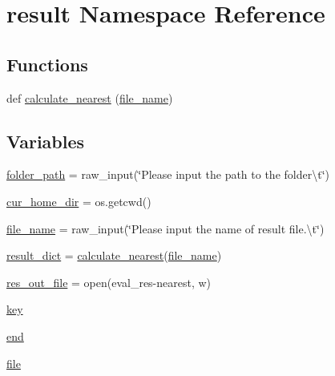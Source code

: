\hypertarget{namespaceresult}{}\section{result Namespace Reference}
\label{namespaceresult}
\subsection*{Functions}
\begin{DoxyCompactItemize}
\item 
def \hyperlink{namespaceresult_a701c28db119049562d7d29ca31055c29}{calculate\+\_\+nearest} (\hyperlink{namespaceresult_acf51e2242cbe71fdb781f378dd1b08f8}{file\+\_\+name})
\end{DoxyCompactItemize}
\subsection*{Variables}
\begin{DoxyCompactItemize}
\item 
\hyperlink{namespaceresult_a28b7e2030adf7744b4ff42da31c0a58a}{folder\+\_\+path} = raw\+\_\+input(\char`\"{}Please input the path to the folder\textbackslash{}t\char`\"{})
\item 
\hyperlink{namespaceresult_ad84b525edcc6cfe3f42a724ad9631920}{cur\+\_\+home\+\_\+dir} = os.\+getcwd()
\item 
\hyperlink{namespaceresult_acf51e2242cbe71fdb781f378dd1b08f8}{file\+\_\+name} = raw\+\_\+input(\char`\"{}Please input the name of result file.\textbackslash{}t\char`\"{})
\item 
\hyperlink{namespaceresult_ac6537f54ad765b7bd38c3ac05ba11853}{result\+\_\+dict} = \hyperlink{namespaceresult_a701c28db119049562d7d29ca31055c29}{calculate\+\_\+nearest}(\hyperlink{namespaceresult_acf51e2242cbe71fdb781f378dd1b08f8}{file\+\_\+name})
\item 
\hyperlink{namespaceresult_a3e9c34d216aa54944d35a8d48a885ee9}{res\+\_\+out\+\_\+file} = open(\textquotesingle{}eval\+\_\+res-\/nearest\textquotesingle{}, \textquotesingle{}w\textquotesingle{})
\item 
\hyperlink{namespaceresult_a37523b375176c9d24964d26e915bce32}{key}
\item 
\hyperlink{namespaceresult_a1e68669dab0e16d7d2c66523354a8045}{end}
\item 
\hyperlink{namespaceresult_ae5575afe3471c44d58e35b68ecc4a82f}{file}
\end{DoxyCompactItemize}


